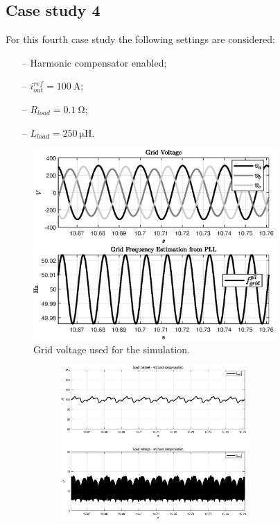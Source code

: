 \documentclass[11pt,a4paper,oneside]{book}
\numberwithin{equation}{section}
\theoremstyle{it}
\theoremstyle{definition}
\begin{document}
\begin{onehalfspace}
\section{Case study 4}
For this fourth case study the following settings are considered:
\begin{itemize}
	\item[--] Harmonic compensator enabled;
	\item[--] $i_{out}^{ref}=\SI{100}{\ampere}$;
	\item[--] $R_{load}=\SI{0.1}{\ohm}$;	
	\item[--] $L_{load}=\SI{250}{\micro\henry}$.
\end{itemize}
\begin{figure}[H]
	\centering
	\includegraphics[width = 260pt, angle = 0, 
	keepaspectratio]{figures/sr_with_full_load_2/with_comp_fig_2.eps}
	\captionsetup{width=0.5\textwidth, font=small}	
	\caption{Grid voltage used for the simulation.}
	\label{}
\end{figure}
\begin{figure}[H]
	\centering
	\begin{subfigure}{0.5\textwidth}
		\centering
		\includegraphics[width = 200pt, angle = 0, 
		keepaspectratio]{figures/sr_with_full_load_2/with_comp_fig_4.eps}
		\captionsetup{width=0.65\textwidth, font=footnotesize}	

\end{subfigure}
\end{figure}
\end{onehalfspace}
\end{document}
